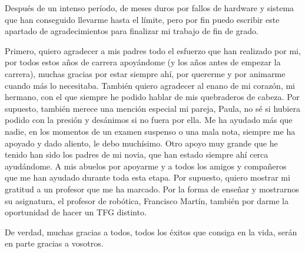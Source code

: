 \documentclass[twoside,a4paper,12pt,openany]{book}
\begin{document}
Después de un intenso período, de meses duros por fallos de hardware y sistema que han conseguido llevarme hasta el límite, pero por fin puedo escribir este apartado de agradecimientos para finalizar mi trabajo de fin de grado.

Primero, quiero agradecer a mis padres todo el esfuerzo que han realizado por mi, por todos estos años de carrera apoyándome (y los años antes de empezar la carrera), muchas gracias por estar siempre ahí, por quererme y por animarme cuando más lo necesitaba.
También quiero agradecer al enano de mi corazón, mi hermano, con el que siempre he podido hablar de mis quebraderos de cabeza.
Por supuesto, también merece una mención especial mi pareja, Paula, no sé si hubiera podido con la presión y desánimos si no fuera por ella. Me ha ayudado más que nadie, en los momentos de un examen suspenso o una mala nota, siempre me ha apoyado y dado aliento, le debo muchísimo.
Otro apoyo muy grande que he tenido han sido los padres de mi novia, que han estado siempre ahí cerca ayudándome.
A mis abuelos por apoyarme y a todos los amigos y compañeros que me han ayudado durante toda esta etapa.
Por supuesto, quiero mostrar mi gratitud a un profesor que me ha marcado. Por la forma de enseñar y mostrarnos su asignatura, el profesor de robótica, Francisco Martín, también por darme la oportunidad de hacer un TFG distinto.

De verdad, muchas gracias a todos, todos los éxitos que consiga en la vida, serán en parte gracias a vosotros.

\clearpage
\newpage{\pagestyle{empty}\cleardoublepage}

\newpage{\pagestyle{empty}\cleardoublepage} 
%


\frontmatter
\tableofcontents

\listoffigures

\mainmatter

\setcounter{page}{1}
















\end{document}

